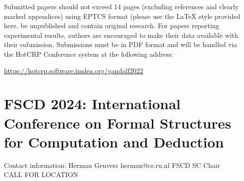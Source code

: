\documentclass[prodmode,acmtecs]{acmsmall} %
\begin{document}
\begin{itemize}
  Submitted papers should not exceed 14 pages (excluding references and clearly marked appendices) using EPTCS format (please use the LaTeX style provided here, be unpublished and contain original research. For papers reporting experimental results, authors are encouraged to make their data available with their submission. Submissions must be in PDF format and will be handled via the HotCRP Conference system at the following address: 
 
  \href{https://hotcrp.software.imdea.org/gandalf2022}{https://hotcrp.software.imdea.org/gandalf2022} 
 
\end{itemize}\section{FSCD 2024: International Conference on Formal Structures for Computation and Deduction}\label{FSCD2024}  Contact information: Herman Geuvers herman@cs.ru.nl FSCD SC Chair\\ 
CALL FOR LOCATION 
\end{document}
